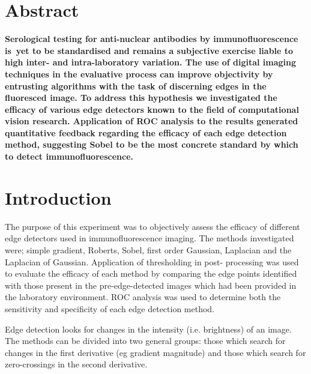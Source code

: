 \documentclass[a4paper]{article}
\begin{document}
\vspace{1em}

\vspace{.5em}

\begin{multicols*}{2}

\section*{\normalsize Abstract}

\textbf{\small Serological testing for anti-nuclear antibodies by immunofluorescence is~yet to be standardised and remains a subjective exercise liable to high inter- and intra-laboratory variation. The use of digital imaging techniques in the evaluative process can improve objectivity by entrusting algorithms with the task of discerning edges in the fluoresced image. To address this hypothesis we investigated the efficacy of various edge detectors known to the field of computational vision research. Application of ROC analysis to the results generated quantitative feedback regarding the efficacy of each edge detection method, suggesting Sobel to be the most concrete standard by which to detect immunofluorescence.}

\section*{Introduction}

The purpose of this experiment was to objectively assess the efficacy of different edge detectors used in immunofluorescence imaging. The methods investigated were; simple gradient, Roberts, Sobel, first order Gaussian, Laplacian and the Laplacian of Gaussian. Application of thresholding in post- processing was used to evaluate the efficacy of each method by comparing the edge points identified with those present in the pre-edge-detected images which had been provided in the laboratory environment. ROC analysis was used to determine both the sensitivity and specificity of each edge detection method. 

Edge detection looks for changes in the intensity (i.e. brightness) of an image. The methods can be divided into two general groups: those which search for changes in the first derivative (eg gradient magnitude) and those which search for zero-crossings in the second derivative. 


\end{multicols*}
\end{document}
